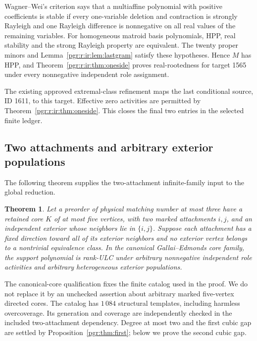 \documentclass[11pt]{article}
\numberwithin{equation}{section}
\newtheorem{theorem}{Theorem}[section]\newtheorem{lemma}[theorem]{Lemma}\newtheorem{proposition}[theorem]{Proposition}\newtheorem{corollary}[theorem]{Corollary}
\theoremstyle{definition}\newtheorem{definition}[theorem]{Definition}\newtheorem{remark}[theorem]{Remark}
\begin{document}
Wagner--Wei's criterion \cite[Theorem 3(c)]{WW} says that a multiaffine polynomial with positive coefficients is stable if every one-variable deletion and contraction is strongly Rayleigh and one Rayleigh difference is nonnegative on all real values of the remaining variables. For homogeneous matroid basis polynomials, HPP, real stability and the strong Rayleigh property are equivalent. The twenty proper minors and Lemma~\ref{pgr:r:ir:lem:lastgram} satisfy these hypotheses. Hence $M$ has HPP, and Theorem~\ref{pgr:r:ir:thm:oneside} proves real-rootedness for target 1565 under every nonnegative independent role assignment.

The existing approved extremal-class refinement maps the last conditional source, ID 1611, to this target. Effective zero activities are permitted by Theorem~\ref{pgr:r:ir:thm:oneside}. This closes the final two entries in the selected finite ledger.

\subsection{Two attachments and arbitrary exterior populations}\label{pgr:r:ir:sec:a2}
The following theorem supplies the two-attachment infinite-family input to the global reduction.
\begin{theorem}\label{pgr:r:ir:thm:a2}
Let a preorder of physical matching number at most three have a retained core $K$ of at most five vertices, with two marked attachments $i,j$, and an independent exterior whose neighbors lie in $\{i,j\}$. Suppose each attachment has a fixed direction toward all of its exterior neighbors and no exterior vertex belongs to a nontrivial equivalence class. In the canonical Gallai--Edmonds core family, the support polynomial is rank-ULC under arbitrary nonnegative independent role activities and arbitrary heterogeneous exterior populations.
\end{theorem}
The canonical-core qualification fixes the finite catalog used in the proof. We do not replace it by an unchecked assertion about arbitrary marked five-vertex directed cores. The catalog has $1\,084$ structural templates, including harmless overcoverage. Its generation and coverage are independently checked in the included two-attachment dependency. Degree at most two and the first cubic gap are settled by Proposition~\ref{pgr:thm:first}; below we prove the second cubic gap.
\end{document}
